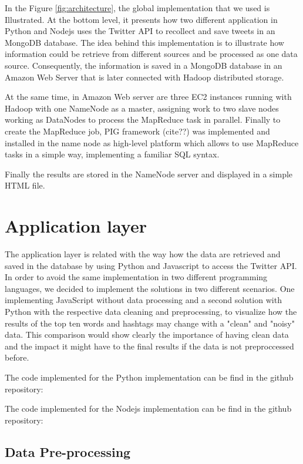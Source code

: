 \documentclass{article}
\begin{document}
        In the Figure \ref{fig:architecture}, the global implementation that we used is Illustrated. At the bottom level, it presents how two different application in Python and Nodejs uses the Twitter API to recollect and save tweets in an MongoDB database. The idea behind this implementation is to illustrate how information could be retrieve from different sources and be processed as one data source.
        Consequently, the information is saved in a MongoDB database in an Amazon Web Server that is later connected with Hadoop distributed storage.

        At the same time, in Amazon Web server are three EC2 instances running with Hadoop with one NameNode as a master, assigning work to two slave nodes working as DataNodes to process the MapReduce task in parallel. Finally to create the MapReduce job, PIG framework (cite??) was implemented and installed in the name node as high-level platform which allows to use MapReduce tasks in a simple way, implementing a familiar SQL syntax.

        Finally the results are stored in the NameNode server and displayed in a simple HTML file.

        
        \section{Application layer}

        The application layer is related with the way how the data are retrieved and saved in the database by using Python and Javascript to access the Twitter API. In order to avoid the same implementation in two different programming languages,
        we decided to implement the solutions in two different scenarios. One implementing JavaScript without data processing and a second solution with Python  with the respective data cleaning and preprocessing, to
        visualize how the results of the top ten words and hashtags may change with a "clean" and "noisy" data. This comparison would show clearly the importance of having clean data and the impact it might have to the final results if the data is not preproccessed before.

        The code implemented for the Python implementation can be find in the github repository: %

        The code implemented for the Nodejs implementation can be find in the github repository: %

        \subsection{Data Pre-processing}
\end{document}
